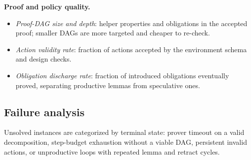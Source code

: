 \textbf{Proof and policy quality.}
\begin{itemize}[nosep]
    \item \emph{Proof-DAG size and depth}: helper properties and obligations
    in the accepted proof; smaller DAGs are more targeted and cheaper to
    re-check.
    \item \emph{Action validity rate}: fraction of actions accepted by the
    environment schema and design checks.
    \item \emph{Obligation discharge rate}: fraction of introduced
    obligations eventually proved, separating productive lemmas from
    speculative ones.
\end{itemize}

\subsection{Failure analysis}
\label{sec:exp-failures}

Unsolved instances are categorized by terminal state: prover timeout on a
valid decomposition, step-budget exhaustion without a viable DAG, persistent
invalid actions, or unproductive loops with repeated lemma and retract cycles.
